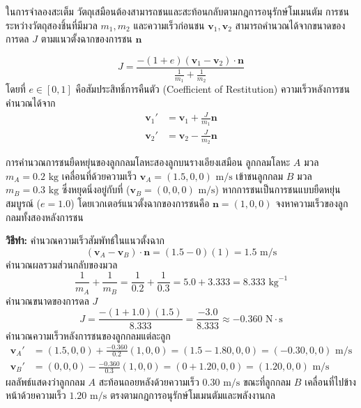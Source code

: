 ในการจำลองสะเต็ม วัตถุเสมือนต้องสามารถชนและสะท้อนกลับตามกฎการอนุรักษ์โมเมนตัม การชนระหว่างวัตถุสองชิ้นที่มีมวล $m_1, m_2$ และความเร็วก่อนชน $\mathbf{v}_1, \mathbf{v}_2$ สามารถคำนวณได้จากขนาดของการดล $J$ ตามแนวตั้งฉากของการชน $\mathbf{n}$

\begin{equation}
J = \frac{-(1 + e)(\mathbf{v}_1 - \mathbf{v}_2)\cdot \mathbf{n}}{\frac{1}{m_1} + \frac{1}{m_2}}
\end{equation}
โดยที่ $e \in [0, 1]$ คือสัมประสิทธิ์การคืนตัว (Coefficient of Restitution) ความเร็วหลังการชนคำนวณได้จาก
\begin{align}
\mathbf{v}_1' &= \mathbf{v}_1 + \frac{J}{m_1}\mathbf{n} \\
\mathbf{v}_2' &= \mathbf{v}_2 - \frac{J}{m_2}\mathbf{n}
\end{align}

\begin{workedexamplebox}{การคำนวณการชนยืดหยุ่นของลูกกลมโลหะสองลูกบนรางเอียงเสมือน}
ลูกกลมโลหะ $A$ มวล $m_A = 0.2\text{ kg}$ เคลื่อนที่ด้วยความเร็ว $\mathbf{v}_A = (1.5, 0, 0)\text{ m/s}$ เข้าชนลูกกลม $B$ มวล $m_B = 0.3\text{ kg}$ ซึ่งหยุดนิ่งอยู่กับที่ ($\mathbf{v}_B = (0, 0, 0)\text{ m/s}$) หากการชนเป็นการชนแบบยืดหยุ่นสมบูรณ์ ($e = 1.0$) โดยเวกเตอร์แนวตั้งฉากของการชนคือ $\mathbf{n} = (1, 0, 0)$ จงหาความเร็วของลูกกลมทั้งสองหลังการชน

\textbf{วิธีทำ:}
คำนวณความเร็วสัมพัทธ์ในแนวตั้งฉาก
\begin{equation}
(\mathbf{v}_A - \mathbf{v}_B)\cdot \mathbf{n} = (1.5 - 0)(1) = 1.5\text{ m/s}
\end{equation}
คำนวณผลรวมส่วนกลับของมวล
\begin{equation}
\frac{1}{m_A} + \frac{1}{m_B} = \frac{1}{0.2} + \frac{1}{0.3} = 5.0 + 3.333 = 8.333\text{ kg}^{-1}
\end{equation}
คำนวณขนาดของการดล $J$
\begin{equation}
J = \frac{-(1 + 1.0)(1.5)}{8.333} = \frac{-3.0}{8.333} \approx -0.360\text{ N}\cdot\text{s}
\end{equation}
คำนวณความเร็วหลังการชนของลูกกลมแต่ละลูก
\begin{align}
\mathbf{v}_A' &= (1.5, 0, 0) + \frac{-0.360}{0.2}(1, 0, 0) = (1.5 - 1.80, 0, 0) = (-0.30, 0, 0)\text{ m/s} \\
\mathbf{v}_B' &= (0, 0, 0) - \frac{-0.360}{0.3}(1, 0, 0) = (0 + 1.20, 0, 0) = (1.20, 0, 0)\text{ m/s}
\end{align}
ผลลัพธ์แสดงว่าลูกกลม $A$ สะท้อนถอยหลังด้วยความเร็ว $0.30\text{ m/s}$ ขณะที่ลูกกลม $B$ เคลื่อนที่ไปข้างหน้าด้วยความเร็ว $1.20\text{ m/s}$ ตรงตามกฎการอนุรักษ์โมเมนตัมและพลังงานกล
\end{workedexamplebox}

